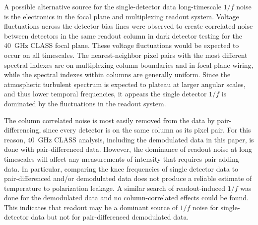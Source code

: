 \documentclass[twocolumn, tighten, numberedappendix, twocolappendix]{aastex63}
\begin{document}
A possible alternative source for the single-detector data long-timescale $1/f$ noise is the electronics in the focal plane and multiplexing readout system. Voltage fluctuations across the detector bias lines were observed to create correlated noise between detectors in the same readout column in dark detector testing for the 40~GHz CLASS focal plane. These voltage fluctuations would be expected to occur on all timescales. The nearest-neighbor pixel pairs with the most different spectral indexes are on multiplexing column boundaries and in-focal-plane-wiring, while the spectral indexes within columns are generally uniform. Since the atmospheric turbulent spectrum is expected to plateau at larger angular scales, and thus lower temporal frequencies, it appears the single detector $1/f$ is dominated by the fluctuations in the readout system. 


The column correlated noise is most easily removed from the data by pair-differencing, since every detector is on the same column as its pixel pair. For this reason, 40~GHz CLASS analysis, including the demodulated data in this paper, is done with pair-differenced data. However, the dominance of readout noise at long timescales will affect any measurements of intensity that requires pair-adding data. In particular, comparing the knee frequencies of single detector data to pair-differenced and/or demodulated data does not produce a reliable estimate of temperature to polarization leakage. A similar search of readout-induced $1/f$ was done for the demodulated data and no column-correlated effects could be found. This indicates that readout may be a dominant source of $1/f$ noise for single-detector data but not for pair-differenced demodulated data.



\end{document}
